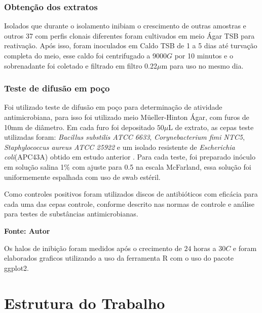 \subsubsection{Obtenção dos extratos}
Isolados que durante o isolamento inibiam o crescimento de outras amostras e outros 37
com perfis clonais diferentes foram cultivados em meio Ágar TSB para
reativação. Após isso, foram inoculados em Caldo TSB de 1 a 5 dias até turvação completa
do meio, esse caldo foi centrifugado a 9000$G$ por 10 minutos e o sobrenadante foi coletado
e filtrado em filtro 0.22$\mu$m para uso no mesmo dia.
\subsubsection{Teste de difusão em poço}
Foi utilizado teste de difusão em poço para determinação de atividade antimicrobiana,
para isso foi utilizado meio Müeller-Hinton Ágar, com furos de 10mm de diâmetro.
Em cada furo foi depositado $50\mu$L de extrato, as cepas teste utilizadas foram:
\textit{Bacillus substilis ATCC 6633}, \textit{Corynebacterium fimi NTC5}, \textit{Staphylococcus aureus ATCC 25922}
e um isolado resistente de \textit{Escherichia coli}(APC43A) obtido em estudo anterior \cite{dhara2019}.
Para cada teste, foi preparado inóculo em solução salina 1\% com ajuste para 0.5
na escala McFarland, essa solução foi uniformemente espalhada com uso de swab estéril.

Como controles positivos foram utilizados discos de antibióticos com
eficácia para cada uma das cepas controle, conforme descrito nas normas de controle e
análise para testes de substâncias antimicrobianas\cite{clsi2020}.

\begin{table}
    \caption{Antibióticos utilizados como controle}
    \label{tab:lista_antibioticos}
    \centering
    \begin{small}\textbf{Fonte: Autor}\end{small}
\end{table}


Os halos de inibição foram medidos após o crecimento de $24$ horas a $30$\textdegree$C$
e foram elaborados graficos utilizando a uso da ferramenta R com o uso do pacote ggplot2.

\section{Estrutura do Trabalho}



